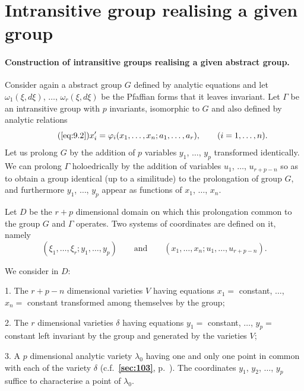 \documentclass[leqno,11pt]{book}
\makeatletter
\numberwithin{equation}{chapter}
\theoremstyle{shape1}
\theoremstyle{shapesmall}
\let\old@phi\phi
\let\old@varphi\varphi
\let\phi\old@varphi
\let\varphi\old@phi
\newcommand{\fsref}[1]{{\rm\textsection\textbf{\ref{sec:#1}}}}
\newcommand{\somespace}{\vspace{9pt}}
\makeatother
\begin{document}
\section{Intransitive group realising a given group}
\label{sec:intr-group-real}

\paragraph{Construction of intransitive groups realising a given abstract group.}
\label{sec:119}
Consider again a abstract group $G$ defined by analytic equations and let $\omega_{1}(\xi,d\xi)$, $\dots$, $\omega_{r}(\xi,d\xi)$ be the Pfaffian forms that it leaves invariant. Let $\Gamma$ be an intransitive group with $p$ invariants, isomorphic to $G$ and also defined by analytic relations
\begin{equation}
  \label{eq:9.2a}\tag{\ref{eq:9.2}}
  x'_{i}=\phi_{i}(x_{1},\dots,x_{n};a_{1},\dots,a_{r}),\qquad(i=1,\dots,n).
\end{equation}
Let us prolong $G$ by the addition of $p$ variables $y_{1}$, $\dots$, $y_{p}$ transformed identically. We can prolong $\Gamma$ holoedrically by the addition of variables $u_{1}$, $\dots$, $u_{r+p-n}$ so as to obtain a group identical (up to a similitude) to the prolongation of group $G$, and furthermore $y_{1}$, $\dots$, $y_{p}$ appear as functions of $x_{1}$, $\dots$, $x_{n}$.

Let $D$ be the $r+p$ dimensional domain on which this prolongation common to the group $G$ and $\Gamma$ operates. Two systems of coordinates are defined on it, namely
\[
(\xi_{1},\dots,\xi_{r};y_{1},\dots,y_{p})\qquad\text{and}\qquad(x_{1},\dots,x_{n};u_{1},\dots,u_{r+p-n}).
\]

We consider in $D$:

\somespace

1. The $r+p-n$ dimensional varieties $V$ having equations $x_{1}=$ constant, $\dots$, $x_{n}=$ constant transformed among themselves by the group;

2. The $r$ dimensional varieties $\delta$ having equations $y_{1}=$ constant, $\dots$, $y_{p}=$ constant left invariant by the group and generated by the varieties $V$;

3. A $p$ dimensional analytic variety $\lambda_{0}$ having one and only one point in common with each of the variety $\delta$ (c.f.~\fsref{103}, p.~\pageref{sec:103}). The coordinates $y_{1}$, $y_{2}$, $\dots$, $y_{p}$ suffice to characterise a point of $\lambda_{0}$.
\end{document}
